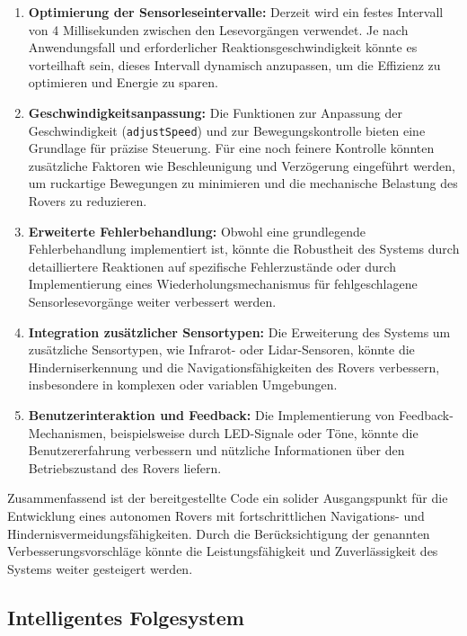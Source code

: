 \documentclass{vorlage-design-main}
\begin{document}
\begin{enumerate}
\def\labelenumi{\arabic{enumi}.}
\item
  \textbf{Optimierung der Sensorleseintervalle:} Derzeit wird ein festes
  Intervall von 4 Millisekunden zwischen den Lesevorgängen verwendet. Je
  nach Anwendungsfall und erforderlicher Reaktionsgeschwindigkeit könnte
  es vorteilhaft sein, dieses Intervall dynamisch anzupassen, um die
  Effizienz zu optimieren und Energie zu sparen.
\item
  \textbf{Geschwindigkeitsanpassung:} Die Funktionen zur Anpassung der
  Geschwindigkeit (\verb|adjustSpeed|) und zur
  Bewegungskontrolle bieten eine Grundlage für präzise Steuerung. Für
  eine noch feinere Kontrolle könnten zusätzliche Faktoren wie
  Beschleunigung und Verzögerung eingeführt werden, um ruckartige
  Bewegungen zu minimieren und die mechanische Belastung des Rovers zu
  reduzieren.
\item
  \textbf{Erweiterte Fehlerbehandlung:} Obwohl eine grundlegende
  Fehlerbehandlung implementiert ist, könnte die Robustheit des Systems
  durch detailliertere Reaktionen auf spezifische Fehlerzustände oder
  durch Implementierung eines Wiederholungsmechanismus für
  fehlgeschlagene Sensorlesevorgänge weiter verbessert werden.
\item
  \textbf{Integration zusätzlicher Sensortypen:} Die Erweiterung des
  Systems um zusätzliche Sensortypen, wie Infrarot- oder Lidar-Sensoren,
  könnte die Hinderniserkennung und die Navigationsfähigkeiten des
  Rovers verbessern, insbesondere in komplexen oder variablen
  Umgebungen.
\item
  \textbf{Benutzerinteraktion und Feedback:} Die Implementierung von
  Feedback-Mechanismen, beispielsweise durch LED-Signale oder Töne,
  könnte die Benutzererfahrung verbessern und nützliche Informationen
  über den Betriebszustand des Rovers liefern.
\end{enumerate}

Zusammenfassend ist der bereitgestellte Code ein solider Ausgangspunkt
für die Entwicklung eines autonomen Rovers mit fortschrittlichen
Navigations- und Hindernisvermeidungsfähigkeiten. Durch die
Berücksichtigung der genannten Verbesserungsvorschläge könnte die
Leistungsfähigkeit und Zuverlässigkeit des Systems weiter gesteigert
werden.

\hypertarget{intelligentes-folgesystem}{%
\subsection{Intelligentes Folgesystem}\label{intelligentes-folgesystem}}
\end{document}
